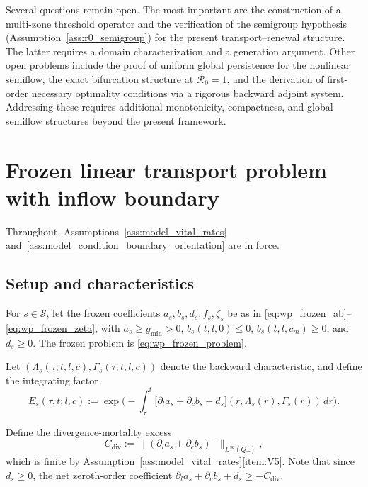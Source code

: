 \documentclass[pdflatex,sn-mathphys-num]{sn-jnl}%
\begin{document}
Several questions remain open. 
The most important are the construction of a multi-zone threshold operator and the verification of the semigroup hypothesis (Assumption~\ref{ass:r0_semigroup}) for the present
transport--renewal structure. The latter requires a domain characterization and a generation argument. 
Other open problems include the proof of uniform global persistence for the nonlinear semiflow, the exact bifurcation structure at \(\mathcal R_0=1\), and the derivation of first-order necessary optimality conditions via a rigorous backward
adjoint system.
Addressing these requires additional monotonicity, compactness, and
global semiflow structures beyond the present framework.


\appendix
\section{Frozen linear transport problem with inflow boundary}%
\label{app:linear_transport}
Throughout, Assumptions~\ref{ass:model_vital_rates} and~\ref{ass:model_condition_boundary_orientation} are in force.

\subsection{Setup and characteristics}
For \(s\in\mathcal S\), let the frozen coefficients \(a_s,b_s,d_s,f_s,\zeta_s\) be as
in \eqref{eq:wp_frozen_ab}--\eqref{eq:wp_frozen_zeta}, with
\(a_s\ge g_{\min}>0\), \(b_s(t,l,0)\le 0\), \(b_s(t,l,c_m)\ge 0\), and \(d_s\ge 0\).
The frozen problem is \eqref{eq:wp_frozen_problem}.

Let \((\Lambda_s(\tau;t,l,c),\Gamma_s(\tau;t,l,c))\) denote the backward characteristic,
and define the integrating factor
\begin{equation}\label{eq:appA_integrating_factor}
E_s(\tau,t;l,c)
:=
\exp\!\Big(
-\int_\tau^t
\big[\partial_l a_s+\partial_c b_s+d_s\big](r,\Lambda_s(r),\Gamma_s(r))\,dr
\Big).
\end{equation}

Define the divergence-mortality excess
\begin{equation}\label{eq:appA_C_div}
C_{\mathrm{div}}
:=
\big\|(\partial_l a_s+\partial_c b_s)^-\big\|_{L^\infty(Q_T)},
\end{equation}
which is finite by Assumption~\ref{ass:model_vital_rates}\ref{item:V5}. Note that since
\(d_s\ge 0\), the net zeroth-order coefficient
\(\partial_l a_s+\partial_c b_s+d_s\ge -C_{\mathrm{div}}\).
\end{document}

